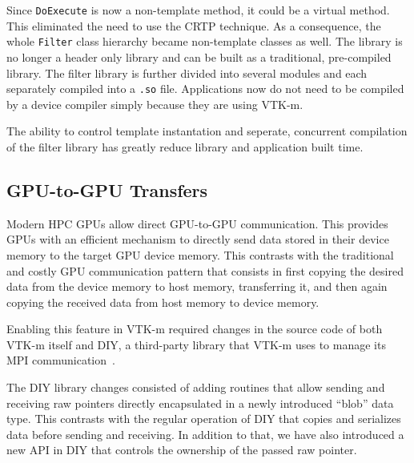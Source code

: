 Since \texttt{DoExecute} is now a non-template method, it could be a virtual method. This eliminated the need to use the CRTP technique. As a consequence, the whole \texttt{Filter} class hierarchy became non-template classes as well. The library is no longer a header only library and can be built as a traditional, pre-compiled library. The filter library is further divided into several modules and each separately compiled into a \texttt{.so} file. Applications now do not need to be compiled by a device compiler simply because they are using VTK-m.

The ability to control template instantation and seperate, concurrent compilation of the filter library has greatly reduce library and application built time.

\subsection{GPU-to-GPU Transfers}

Modern HPC GPUs allow direct GPU-to-GPU communication. This provides GPUs with an efficient mechanism to directly send data stored in their device memory to the target GPU device memory. This contrasts with the traditional and costly GPU communication pattern that consists in first copying the desired data from the device memory to host memory, transferring it, and then again copying the received data from host memory to device memory.

Enabling this feature in VTK-m required changes in the source code of both VTK-m itself and DIY, a third-party library that VTK-m uses to manage its MPI communication~\cite{Peterka2011,Morozov2016}.

The DIY library changes consisted of adding routines that allow sending and receiving raw pointers directly encapsulated in a newly introduced ``blob'' data type. This contrasts with the regular operation of DIY that copies and serializes data before sending and receiving. In addition to that, we have also introduced a new API in DIY that controls the ownership of the passed raw pointer.

